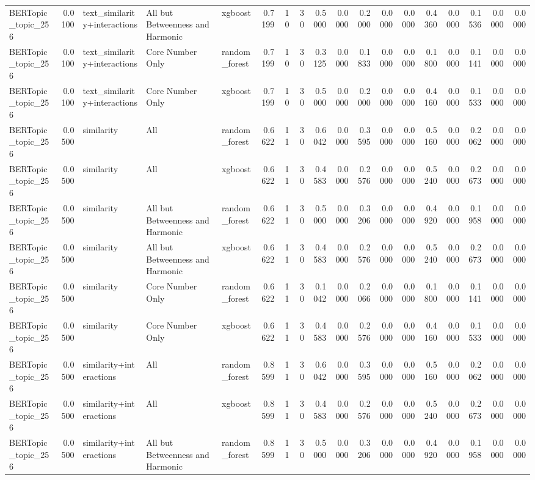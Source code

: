 \begin{tabular}{lrlllrrrrrrrrrrrrr}
BERTopic_topic_256 & 0.0100 & text_similarity+interactions & All but Betweenness and Harmonic & xgboost & 0.7199 & 10 & 30 & 0.5000 & 0.0000 & 0.2000 & 0.0000 & 0.0000 & 0.4360 & 0.0000 & 0.1536 & 0.0000 & 0.0000 \\
BERTopic_topic_256 & 0.0100 & text_similarity+interactions & Core Number Only & random_forest & 0.7199 & 10 & 30 & 0.3125 & 0.0000 & 0.1833 & 0.0000 & 0.0000 & 0.1800 & 0.0000 & 0.1141 & 0.0000 & 0.0000 \\
BERTopic_topic_256 & 0.0100 & text_similarity+interactions & Core Number Only & xgboost & 0.7199 & 10 & 30 & 0.5000 & 0.0000 & 0.2000 & 0.0000 & 0.0000 & 0.4160 & 0.0000 & 0.1533 & 0.0000 & 0.0000 \\
BERTopic_topic_256 & 0.0500 & similarity & All & random_forest & 0.6622 & 11 & 30 & 0.6042 & 0.0000 & 0.3595 & 0.0000 & 0.0000 & 0.5160 & 0.0000 & 0.2062 & 0.0000 & 0.0000 \\
BERTopic_topic_256 & 0.0500 & similarity & All & xgboost & 0.6622 & 11 & 30 & 0.4583 & 0.0000 & 0.2576 & 0.0000 & 0.0000 & 0.5240 & 0.0000 & 0.2673 & 0.0000 & 0.0000 \\
BERTopic_topic_256 & 0.0500 & similarity & All but Betweenness and Harmonic & random_forest & 0.6622 & 11 & 30 & 0.5000 & 0.0000 & 0.3206 & 0.0000 & 0.0000 & 0.4920 & 0.0000 & 0.1958 & 0.0000 & 0.0000 \\
BERTopic_topic_256 & 0.0500 & similarity & All but Betweenness and Harmonic & xgboost & 0.6622 & 11 & 30 & 0.4583 & 0.0000 & 0.2576 & 0.0000 & 0.0000 & 0.5240 & 0.0000 & 0.2673 & 0.0000 & 0.0000 \\
BERTopic_topic_256 & 0.0500 & similarity & Core Number Only & random_forest & 0.6622 & 11 & 30 & 0.1042 & 0.0000 & 0.2066 & 0.0000 & 0.0000 & 0.1800 & 0.0000 & 0.1141 & 0.0000 & 0.0000 \\
BERTopic_topic_256 & 0.0500 & similarity & Core Number Only & xgboost & 0.6622 & 11 & 30 & 0.4583 & 0.0000 & 0.2576 & 0.0000 & 0.0000 & 0.4160 & 0.0000 & 0.1533 & 0.0000 & 0.0000 \\
BERTopic_topic_256 & 0.0500 & similarity+interactions & All & random_forest & 0.8599 & 11 & 30 & 0.6042 & 0.0000 & 0.3595 & 0.0000 & 0.0000 & 0.5160 & 0.0000 & 0.2062 & 0.0000 & 0.0000 \\
BERTopic_topic_256 & 0.0500 & similarity+interactions & All & xgboost & 0.8599 & 11 & 30 & 0.4583 & 0.0000 & 0.2576 & 0.0000 & 0.0000 & 0.5240 & 0.0000 & 0.2673 & 0.0000 & 0.0000 \\
BERTopic_topic_256 & 0.0500 & similarity+interactions & All but Betweenness and Harmonic & random_forest & 0.8599 & 11 & 30 & 0.5000 & 0.0000 & 0.3206 & 0.0000 & 0.0000 & 0.4920 & 0.0000 & 0.1958 & 0.0000 & 0.0000 \\

\end{tabular}
